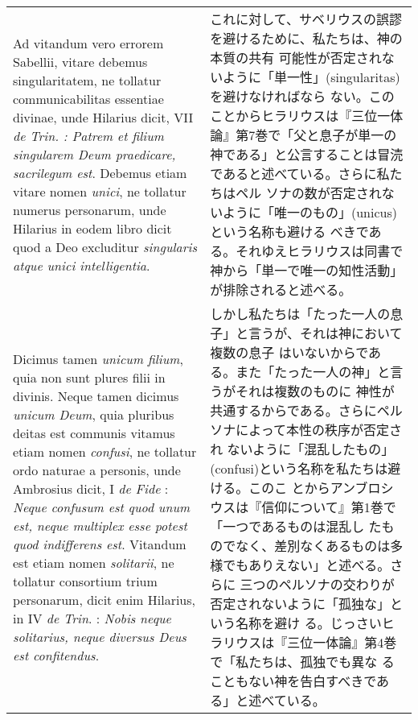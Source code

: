 \documentclass[10pt]{jsarticle} %
\begin{document}
\begin{longtable}{p{21em}p{21em}}
\\



Ad vitandum vero errorem Sabellii, vitare debemus
singularitatem, ne tollatur communicabilitas essentiae divinae, unde
Hilarius dicit, VII {\itshape de Trin. : Patrem et filium singularem Deum
praedicare, sacrilegum est}. Debemus etiam vitare nomen {\itshape unici}, ne
tollatur numerus personarum, unde Hilarius in eodem libro dicit quod a
Deo excluditur {\itshape singularis atque unici intelligentia}. 


&

これに対して、サベリウスの誤謬を避けるために、私たちは、神の本質の共有
 可能性が否定されないように「単一性」(singularitas)を避けなければなら
 ない。このことからヒラリウスは『三位一体論』第7巻で「父と息子が単一の
 神である」と公言することは冒涜であると述べている。さらに私たちはペル
 ソナの数が否定されないように「唯一のもの」(unicus)という名称も避ける
 べきである。それゆえヒラリウスは同書で神から「単一で唯一の知性活動」
 が排除されると述べる。

\\


Dicimus tamen
{\itshape unicum filium}, quia non sunt plures filii in divinis. Neque tamen
dicimus {\itshape unicum Deum}, quia pluribus deitas est communis vitamus etiam
nomen {\itshape confusi}, ne tollatur ordo naturae a personis, unde Ambrosius
dicit, I {\itshape de Fide} : {\itshape Neque confusum est quod unum est, neque multiplex
esse potest quod indifferens est}. Vitandum est etiam nomen {\itshape solitarii},
ne tollatur consortium trium personarum, dicit enim Hilarius, in IV {\itshape de
Trin}. : {\itshape Nobis neque solitarius, neque diversus Deus est
confitendus}. 

&

しかし私たちは「たった一人の息子」と言うが、それは神において複数の息子
 はいないからである。また「たった一人の神」と言うがそれは複数のものに
 神性が共通するからである。さらにペルソナによって本性の秩序が否定され
 ないように「混乱したもの」(confusi)という名称を私たちは避ける。このこ
 とからアンブロシウスは『信仰について』第1巻で「一つであるものは混乱し
 たものでなく、差別なくあるものは多様でもありえない」と述べる。さらに
 三つのペルソナの交わりが否定されないように「孤独な」という名称を避け
 る。じっさいヒラリウスは『三位一体論』第4巻で「私たちは、孤独でも異な
 ることもない神を告白すべきである」と述べている。

\\




\end{longtable}
\end{document}

